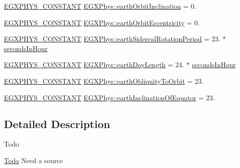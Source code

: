 \begin{DoxyCompactItemize}
\item 
\mbox{\hyperlink{group___e_g_x_phys-_constants-_macros_ga76980d288494ce1714c9ac68a95ba702}{E\+G\+X\+P\+H\+Y\+S\+\_\+\+C\+O\+N\+S\+T\+A\+NT}} \mbox{\hyperlink{group___e_g_x_phys-_constants-_astrophysics-_solar_system-_earth-_orbit_ga077f2f59673907855b0aa50123a32265}{E\+G\+X\+Phys\+::earth\+Orbit\+Inclination}} = 0.
\item 
\mbox{\hyperlink{group___e_g_x_phys-_constants-_macros_ga76980d288494ce1714c9ac68a95ba702}{E\+G\+X\+P\+H\+Y\+S\+\_\+\+C\+O\+N\+S\+T\+A\+NT}} \mbox{\hyperlink{group___e_g_x_phys-_constants-_astrophysics-_solar_system-_earth-_orbit_ga09b479dff54ecdc92386453498b86904}{E\+G\+X\+Phys\+::earth\+Orbit\+Eccentricity}} = 0.
\item 
\mbox{\hyperlink{group___e_g_x_phys-_constants-_macros_ga76980d288494ce1714c9ac68a95ba702}{E\+G\+X\+P\+H\+Y\+S\+\_\+\+C\+O\+N\+S\+T\+A\+NT}} \mbox{\hyperlink{group___e_g_x_phys-_constants-_astrophysics-_solar_system-_earth-_orbit_ga8ed3950e5beb733fd3ff9dad87879824}{E\+G\+X\+Phys\+::earth\+Sidereal\+Rotation\+Period}} = 23. $\ast$ \mbox{\hyperlink{namespace_e_g_x_phys_a7c3165cd93e36f1fb8e9fef80f117bef}{seconds\+In\+Hour}}
\item 
\mbox{\hyperlink{group___e_g_x_phys-_constants-_macros_ga76980d288494ce1714c9ac68a95ba702}{E\+G\+X\+P\+H\+Y\+S\+\_\+\+C\+O\+N\+S\+T\+A\+NT}} \mbox{\hyperlink{group___e_g_x_phys-_constants-_astrophysics-_solar_system-_earth-_orbit_ga224cdc14815d33b6a21b0f2988648cf9}{E\+G\+X\+Phys\+::earth\+Day\+Length}} = 24. $\ast$ \mbox{\hyperlink{namespace_e_g_x_phys_a7c3165cd93e36f1fb8e9fef80f117bef}{seconds\+In\+Hour}}
\item 
\mbox{\hyperlink{group___e_g_x_phys-_constants-_macros_ga76980d288494ce1714c9ac68a95ba702}{E\+G\+X\+P\+H\+Y\+S\+\_\+\+C\+O\+N\+S\+T\+A\+NT}} \mbox{\hyperlink{group___e_g_x_phys-_constants-_astrophysics-_solar_system-_earth-_orbit_gacb42020ec6e5cf996fa8a81f753efbb2}{E\+G\+X\+Phys\+::earth\+Obliquity\+To\+Orbit}} = 23.
\item 
\mbox{\hyperlink{group___e_g_x_phys-_constants-_macros_ga76980d288494ce1714c9ac68a95ba702}{E\+G\+X\+P\+H\+Y\+S\+\_\+\+C\+O\+N\+S\+T\+A\+NT}} \mbox{\hyperlink{group___e_g_x_phys-_constants-_astrophysics-_solar_system-_earth-_orbit_gad9b56019b866d3d6c7f030f37e2cca6b}{E\+G\+X\+Phys\+::earth\+Inclination\+Of\+Equator}} = 23.
\end{DoxyCompactItemize}


\subsection{Detailed Description}
\begin{DoxyRefDesc}{Todo}
\item[\mbox{\hyperlink{todo__todo000002}{Todo}}]Need a source \end{DoxyRefDesc}


